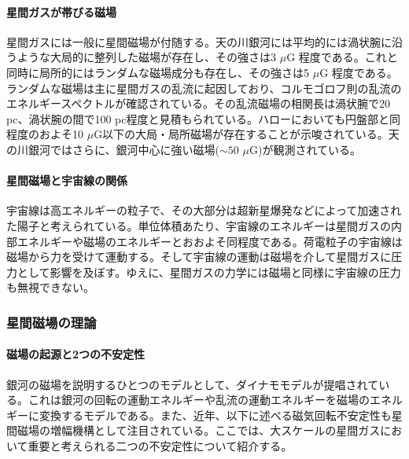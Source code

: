 \paragraph{星間ガスが帯びる磁場}

星間ガスには一般に星間磁場が付随する。天の川銀河には平均的には渦状腕に沿うような大局的に整列した磁場が存在し\citep{1986ARA&A..24..459S}、その強さは3 $\mu$G 程度である。これと同時に局所的にはランダムな磁場成分も存在し、その強さは5 $\mu$G 程度である\citep{1406.0283}。ランダムな磁場は主に星間ガスの乱流に起因しており、コルモゴロフ則の乱流のエネルギースペクトルが確認されている。その乱流磁場の相関長は渦状腕で20 pc、渦状腕の間で100 pc程度と見積もられている\citep{2006ApJ...637L..33H}。ハローにおいても円盤部と同程度のおよそ10 $\mu$G以下の大局・局所磁場が存在することが示唆されている\citep{1406.0283}。天の川銀河ではさらに、銀河中心に強い磁場($\sim 50$ $\mu$G)が観測されている\citep{2010Natur.463...65C}。

\paragraph{星間磁場と宇宙線の関係}

宇宙線は高エネルギーの粒子で、その大部分は超新星爆発などによって加速された陽子と考えられている。単位体積あたり、宇宙線のエネルギーは星間ガスの内部エネルギーや磁場のエネルギーとおおよそ同程度である\citep{2001RvMP...73.1031F}。荷電粒子の宇宙線は磁場から力を受けて運動する。そして宇宙線の運動は磁場を介して星間ガスに圧力として影響を及ぼす。ゆえに、星間ガスの力学には磁場と同様に宇宙線の圧力も無視できない\citep{1966ApJ...145..811P}。

\subsubsection{星間磁場の理論}
\label{c06.s1.ss2.sss2}

\paragraph{磁場の起源と2つの不安定性}

銀河の磁場を説明するひとつのモデルとして、ダイナモモデルが提唱されている\citep{1971ApJ...163..255P}。これは銀河の回転の運動エネルギーや乱流の運動エネルギーを磁場のエネルギーに変換するモデルである。また、近年、以下に述べる磁気回転不安定性も星間磁場の増幅機構として注目されている。ここでは、大スケールの星間ガスにおいて重要と考えられる二つの不安定性について紹介する。


